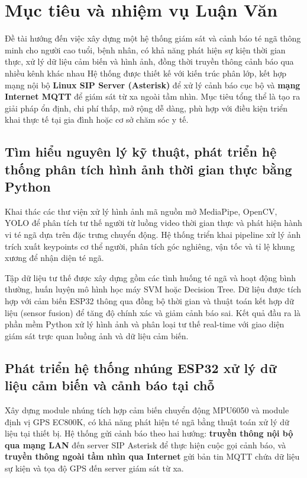 
\section{Mục tiêu và nhiệm vụ Luận Văn}

Đề tài hướng đến việc xây dựng một hệ thống giám sát và cảnh báo té ngã thông minh cho người cao tuổi, bệnh nhân, có khả năng phát hiện sự kiện thời gian thực, xử lý dữ liệu cảm biến và hình ảnh, đồng thời truyền thông cảnh báo qua nhiều kênh khác nhau Hệ thống được thiết kế với kiến trúc phân lớp, kết hợp mạng nội bộ \textbf{Linux SIP Server (Asterisk)} để xử lý cảnh báo cục bộ và \textbf{mạng Internet MQTT} để giám sát từ xa ngoài tầm nhìn. Mục tiêu tổng thể là tạo ra giải pháp ổn định, chi phí thấp, mở rộng dễ dàng, phù hợp với điều kiện triển khai thực tế tại gia đình hoặc cơ sở chăm sóc y tế.

\subsection{Tìm hiểu nguyên lý kỹ thuật, phát triển hệ thống phân tích hình ảnh thời gian thực bằng Python}

Khai thác các thư viện xử lý hình ảnh mã nguồn mở MediaPipe, OpenCV, YOLO để phân tích tư thế người từ luồng video thời gian thực và phát hiện hành vi té ngã dựa trên đặc trưng chuyển động. Hệ thống triển khai pipeline xử lý ảnh trích xuất keypoints cơ thể người, phân tích góc nghiêng, vận tốc và tỉ lệ khung xương để nhận diện té ngã.

Tập dữ liệu tư thế được xây dựng gồm các tình huống té ngã và hoạt động bình thường, huấn luyện mô hình học máy SVM hoặc Decision Tree. Dữ liệu được tích hợp với cảm biến ESP32 thông qua đồng bộ thời gian và thuật toán kết hợp dữ liệu (sensor fusion) để tăng độ chính xác và giảm cảnh báo sai. Kết quả đầu ra là phần mềm Python xử lý hình ảnh và phân loại tư thế real-time với giao diện giám sát trực quan luồng ảnh và dữ liệu cảm biến.

\subsection{Phát triển hệ thống nhúng ESP32 xử lý dữ liệu cảm biến và cảnh báo tại chỗ}

Xây dựng module nhúng tích hợp cảm biến chuyển động MPU6050 và module định vị GPS EC800K, có khả năng phát hiện té ngã bằng thuật toán xử lý dữ liệu tại thiết bị. Hệ thống gửi cảnh báo theo hai hướng: \textbf{truyền thông nội bộ qua mạng LAN} đến server SIP Asterisk để thực hiện cuộc gọi cảnh báo, và \textbf{truyền thông ngoài tầm nhìn qua Internet} gửi bản tin MQTT chứa dữ liệu sự kiện và tọa độ GPS đến server giám sát từ xa.

